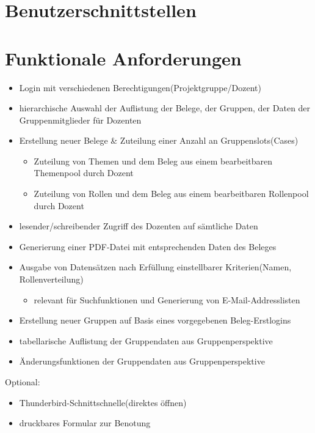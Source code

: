 \documentclass{article}
\begin{document}
\newpage
\part{Benutzerschnittstellen}


\newpage
\part{Funktionale Anforderungen}
\begin{itemize}
\item Login mit verschiedenen Berechtigungen(Projektgruppe/Dozent)
\item hierarchische Auswahl der Auflistung der Belege, der Gruppen, der Daten
der Gruppenmitglieder für Dozenten
\item Erstellung neuer Belege \& Zuteilung einer Anzahl an Gruppenslots(Cases)
\begin{itemize}
\item Zuteilung von Themen und dem Beleg aus einem bearbeitbaren Themenpool durch Dozent
\item Zuteilung von Rollen und dem Beleg aus einem bearbeitbaren Rollenpool durch Dozent
\end{itemize}
\item lesender/schreibender Zugriff des Dozenten auf sämtliche Daten
\item Generierung einer PDF-Datei mit entsprechenden Daten des Beleges
\item Ausgabe von Datensätzen nach Erfüllung einstellbarer Kriterien(Namen,
Rollenverteilung)
\begin{itemize}
\item relevant für Suchfunktionen und Generierung von E-Mail-Addresslisten
\end{itemize}
\end{itemize}
\begin{itemize}
\item Erstellung neuer Gruppen auf Basis eines vorgegebenen Beleg-Erstlogins
\item tabellarische Auflistung der Gruppendaten aus Gruppenperspektive
\item Änderungsfunktionen der Gruppendaten aus Gruppenperspektive
\end{itemize}

Optional:
\begin{itemize}
\item Thunderbird-Schnittschnelle(direktes öffnen)
\item druckbares Formular zur Benotung
\end{itemize}
\end{document}
